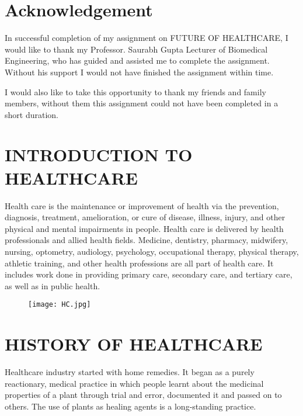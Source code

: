 \documentclass[12pt,a4paper]{article}
\begin{document}
\section{Acknowledgement}

In successful completion of my assignment on FUTURE OF HEALTHCARE, I would like to thank my Professor. Saurabh Gupta Lecturer of Biomedical Engineering, who has guided and assisted me to complete the assignment. Without his support I would not have finished the assignment within time.


I  would also like to take this opportunity to thank my friends and family members, without them this assignment could not have been completed in a short duration.



\clearpage

\section{INTRODUCTION TO HEALTHCARE}

Health care is the maintenance or improvement of health via the prevention, diagnosis, treatment, amelioration, or cure of disease, illness, injury, and other physical and mental impairments in people. Health care is delivered by health professionals and allied health fields. Medicine, dentistry, pharmacy, midwifery, nursing, optometry, audiology, psychology, occupational therapy, physical therapy, athletic training, and other health professions are all part of health care. It includes work done in providing primary care, secondary care, and tertiary care, as well as in public health.



\hspace{5cm}

\begin{figure}[h]
\centering
\texttt{[image: HC.jpg]}
\end{figure}

\clearpage

\section{HISTORY OF HEALTHCARE}

Healthcare industry started with home remedies. It began as a purely reactionary, medical practice in which people learnt about the medicinal properties of a plant through trial and error, documented it and passed on to others. The use of plants as healing agents is a long-standing practice.
\end{document}

